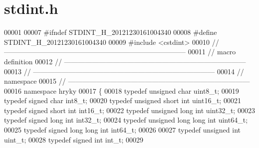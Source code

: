 \hypertarget{stdint_8h_source}{\section{stdint.\-h}
}

\begin{DoxyCode}
00001 
00007 \textcolor{preprocessor}{#ifndef STDINT\_H\_20121230161004340}
00008 \textcolor{preprocessor}{}\textcolor{preprocessor}{#define STDINT\_H\_20121230161004340}
00009 \textcolor{preprocessor}{}\textcolor{preprocessor}{#include <cstdint>}
00010 \textcolor{comment}{//
      ------------------------------------------------------------------------------}
00011 \textcolor{comment}{// macro definition}
00012 \textcolor{comment}{//
      ------------------------------------------------------------------------------}
00013 \textcolor{comment}{//
      ------------------------------------------------------------------------------}
00014 \textcolor{comment}{// namespace}
00015 \textcolor{comment}{//
      ------------------------------------------------------------------------------}
00016 \textcolor{keyword}{namespace }hryky
00017 \{
00018     \textcolor{keyword}{typedef} \textcolor{keywordtype}{unsigned} \textcolor{keywordtype}{char}           uint8\_t;
00019     \textcolor{keyword}{typedef} \textcolor{keywordtype}{signed} \textcolor{keywordtype}{char}             int8\_t;
00020     \textcolor{keyword}{typedef} \textcolor{keywordtype}{unsigned} \textcolor{keywordtype}{short} \textcolor{keywordtype}{int}      uint16\_t;
00021     \textcolor{keyword}{typedef} \textcolor{keywordtype}{signed} \textcolor{keywordtype}{short} \textcolor{keywordtype}{int}        int16\_t;
00022     \textcolor{keyword}{typedef} \textcolor{keywordtype}{unsigned} \textcolor{keywordtype}{long} \textcolor{keywordtype}{int}       uint32\_t;
00023     \textcolor{keyword}{typedef} \textcolor{keywordtype}{signed} \textcolor{keywordtype}{long} \textcolor{keywordtype}{int}         int32\_t;
00024     \textcolor{keyword}{typedef} \textcolor{keywordtype}{unsigned} \textcolor{keywordtype}{long} \textcolor{keywordtype}{long} \textcolor{keywordtype}{int}  uint64\_t;
00025     \textcolor{keyword}{typedef} \textcolor{keywordtype}{signed} \textcolor{keywordtype}{long} \textcolor{keywordtype}{long} \textcolor{keywordtype}{int}    int64\_t;
00026 
00027     \textcolor{keyword}{typedef} \textcolor{keywordtype}{unsigned} \textcolor{keywordtype}{int}            uint\_t;
00028     \textcolor{keyword}{typedef} \textcolor{keywordtype}{signed} \textcolor{keywordtype}{int}              int\_t;
00029 

\end{DoxyCode}
